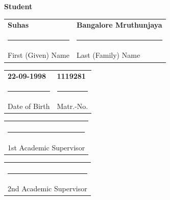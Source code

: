 \thispagestyle{empty}
\textbf{\Large Student}

\vspace{5mm}

\noindent
\begin{tabular}{
		>{\centering\arraybackslash}p{}
		>{\centering\arraybackslash}p{}
	}
	\textbf{Suhas} & \textbf{Bangalore Mruthunjaya} \\
	\rule{0.45\textwidth}{0.4pt} & \rule{0.45\textwidth}{0.4pt} \\
	First (Given) Name & Last (Family) Name
\end{tabular}

\vspace{5mm}

\noindent
\begin{tabular}{
		>{\centering\arraybackslash}p{}
		>{\centering\arraybackslash}p{}
	}
	\textbf{22-09-1998} & \textbf{1119281} \\
	\rule{0.45\textwidth}{0.4pt} & \rule{0.45\textwidth}{0.4pt} \\
	Date of Birth & Matr.-No.
\end{tabular}

\vspace{4mm}

\noindent
\begin{tabular}{
		p{\textwidth}
	}
	\textbf{\myProf} \\
	\rule{\textwidth}{0.4pt} \\
	1st Academic Supervisor
\end{tabular}

\vspace{5mm}

\noindent
\begin{tabular}{
		p{\textwidth}
	}
	\textbf{\myOtherProf} \\
	\rule{\textwidth}{0.4pt} \\
	2nd Academic Supervisor
\end{tabular}

\vspace{7mm}


